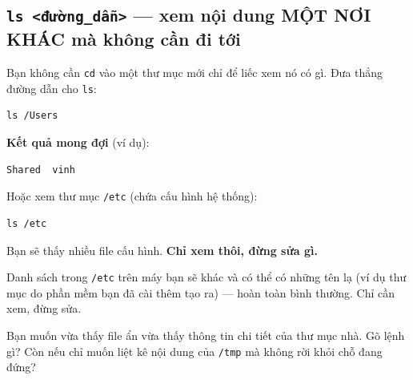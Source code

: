 \documentclass[12pt,a4paper]{article}
\begin{document}
\subsection{\texttt{ls <đường\_dẫn>} --- xem nội dung MỘT NƠI KHÁC mà không cần đi tới}

Bạn không cần \texttt{cd} vào một thư mục mới chỉ để liếc xem nó có gì. Đưa thẳng đường dẫn cho \texttt{ls}:

\begin{codebox}
\begin{verbatim}
ls /Users
\end{verbatim}
\end{codebox}

\textbf{Kết quả mong đợi} (ví dụ):

\begin{codebox}
\begin{verbatim}
Shared  vinh
\end{verbatim}
\end{codebox}

Hoặc xem thư mục \texttt{/etc} (chứa cấu hình hệ thống):

\begin{codebox}
\begin{verbatim}
ls /etc
\end{verbatim}
\end{codebox}

Bạn sẽ thấy nhiều file cấu hình. \textbf{Chỉ xem thôi, đừng sửa gì.}

\begin{notebox}[title={Trấn an}]
Danh sách trong \texttt{/etc} trên máy bạn sẽ khác và có thể có những tên lạ (ví dụ thư mục do phần mềm bạn đã cài thêm tạo ra) --- hoàn toàn bình thường. Chỉ cần xem, đừng sửa.
\end{notebox}

\begin{checkbox}[title={Tự kiểm tra 3}]
Bạn muốn vừa thấy file ẩn vừa thấy thông tin chi tiết của thư mục nhà. Gõ lệnh gì? Còn nếu chỉ muốn liệt kê nội dung của \texttt{/tmp} mà không rời khỏi chỗ đang đứng?
\end{checkbox}
\end{document}
